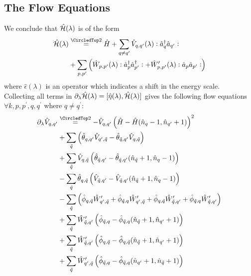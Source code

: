 \begin{appendix}
\subsection{The Flow Equations}
We conclude that $\hat{\mathcal{H}}(\lambda)$ is of the form 
\begin{align}
\ham(\lambda)&\eqsec\hat H+\Sum_{q\neq q^\prime}\hat V_{q,q^\prime}(\lambda)\NO\CR_q\AN_{q^\prime}\NO\\
&+\Sum_{p,p^\prime}\left(\hat W_{p,p^\prime}(\lambda)\NO\CR_p\CR_{p^\prime}\NO+\hat W_{p,p^\prime}^\prime(\lambda)\NO\AN_p\AN_{p^\prime}\NO\right)\nonumber
\end{align}
where $\hat\epsilon(\lambda)$ is an operator which indicates a shift in the energy scale.\\
Collecting all terms in $\partial_\lambda\hat{\mathcal{H}}(\lambda)=[\hat\eta(\lambda),\hat{\mathcal{H}}(\lambda)]$ gives the following flow equations $\forall k, p,p^\prime, q, q^\prime$ where $q\neq q^\prime$:
\begin{subequations}
\begin{align}
\partial_\lambda\hat V_{q,q^\prime}&\eqsec -\hat V_{q,q^\prime} \left(\hat H - \hat H(\hat n_q-1,\hat n_{q^\prime}+1)\right)^2\label{feq_ndep_I}\\
&+ \Sum_{\tilde q} \left(\hat\theta_{q,q^\prime}\hat V_{q^\prime,\tilde q}-\hat\theta_{\tilde q,q^\prime}\hat V_{q,\tilde q}\right) \nonumber\\
&+\Sum_{\tilde q} \hat V_{q,\tilde q}\left(\hat\theta_{\tilde q,q^\prime}-\hat\theta_{\tilde q,q^\prime}(\hat n_{\tilde q}+1,\hat n_q-1)\right)\nonumber \\
&-\Sum_{\tilde q} \hat \theta_{q,\tilde q}\left(\hat V_{\tilde q,q^\prime}-\hat V_{\tilde q,q^\prime}(\hat n_{\tilde q}+1,\hat n_q-1)\right)\nonumber \\
&-\Sum_{\tilde q} \left(\hat\phi_{q,\tilde q}\hat W_{q^\prime,\tilde q}^\prime+\hat\phi_{\tilde q,q}\hat W_{q^\prime,\tilde q}^\prime+\hat\phi_{q,\tilde q}\hat W_{\tilde q,q^\prime}^\prime  + \hat\phi_{\tilde q,q}\hat W_{\tilde q,q^\prime}^\prime\right)\nonumber\\
&+\Sum_{\tilde q}\hat W_{\tilde q,q^\prime}^\prime \left(\hat\phi_{ \tilde q,q}-\hat\phi_{ \tilde q,q}(\hat n_{\tilde q}+1,\hat n_{q^\prime}+1)\right) \nonumber\\
&+\Sum_{\tilde q}\hat W_{\tilde q,q^\prime}^\prime \left(\hat\phi_{q,\tilde q}-\hat\phi_{q,\tilde q}(\hat n_{\tilde q}+1,\hat n_{q^\prime}+1)\right) \nonumber\\
&+\Sum_{\tilde q}\hat W_{q^\prime,\tilde q}^\prime \left(\hat\phi_{\tilde q,q}-\hat\phi_{\tilde q,q}(\hat n_{q^\prime}+1,\hat n_{\tilde q}+1)\right) \nonumber\\

\end{align}
\end{subequations}
\end{appendix}
